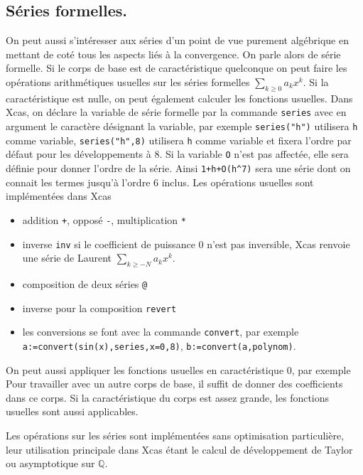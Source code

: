 \documentclass[a4paper,11pt]{book}
\begin{document}
\begin{giacjshere}
\section{S\'eries formelles.} 
On peut aussi s'int\'eresser aux s\'eries d'un point de vue purement
alg\'ebrique en mettant de cot\'e tous
les aspects li\'es \`a la convergence. On parle alors de s\'erie
formelle. Si le corps de base est de caract\'eristique quelconque
on peut faire les op\'erations arithm\'etiques usuelles sur les
s\'eries formelles $\sum_{k\geq 0} a_k x^k$. Si la caract\'eristique
est nulle, on peut \'egalement calculer les fonctions usuelles.
Dans Xcas, on d\'eclare la variable de s\'erie formelle par la commande
\verb|series| avec en argument le caract\`ere d\'esignant la variable, 
par exemple \verb|series("h")| utilisera \verb|h| comme variable,
\verb|series("h",8)| utilisera \verb|h| comme variable
et fixera l'ordre par d\'efaut pour les d\'eveloppements \`a 8. Si la
variable \verb|O| n'est pas affect\'ee, elle sera d\'efinie pour donner
l'ordre de la s\'erie. Ainsi \verb|1+h+O(h^7)| sera une s\'erie
dont on connait les termes jusqu'\`a l'ordre 6 inclus.
Les op\'erations usuelles sont impl\'ement\'ees dans Xcas
\begin{itemize}
\item addition \verb|+|, oppos\'e \verb|-|, multiplication \verb|*|
\item inverse \verb|inv| 
si le coefficient de puissance 0 n'est pas inversible, 
Xcas renvoie une s\'erie de Laurent
$\sum_{k\geq -N} a_k x^k$.
\item composition de deux s\'eries \verb|@|
\item inverse pour la composition \verb|revert|
\item les conversions se font avec la commande \verb|convert|, par
exemple \verb|a:=convert(sin(x),series,x=0,8)|,
\verb|b:=convert(a,polynom)|.
\end{itemize}
On peut aussi appliquer les fonctions usuelles en caract\'eristique 0, par
exemple
Pour travailler avec un autre corps de base, il suffit de donner des
coefficients dans ce corps. Si la caract\'eristique du corps est assez
grande, les fonctions usuelles sont aussi applicables.

Les op\'erations sur les s\'eries sont impl\'ement\'ees sans optimisation
particuli\`ere, leur utilisation principale dans Xcas \'etant le
calcul de d\'eveloppement de Taylor ou asymptotique sur $\mathbb{Q}$.


\end{giacjshere}
\end{document}
